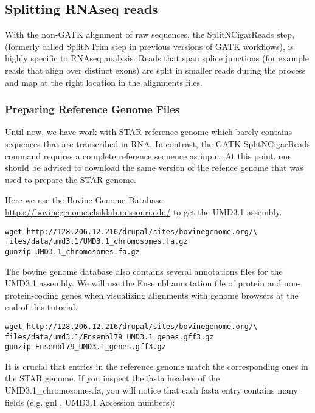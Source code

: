 \subsection{Splitting RNAseq reads}

With the non-GATK alignment of raw sequences, the SplitNCigarReads step, (formerly called SplitNTrim step in previous versions of GATK workflows), is highly specific to RNAseq analysis. Reads that span splice junctions (for example reads that align over distinct exons) are split in smaller reads during the process and map at the right location in the alignments files.

\subsubsection{Preparing Reference Genome Files}

Until now, we have work with STAR reference genome which barely contains sequences that are transcribed in RNA. In contrast, the GATK SplitNCigarReads command requires a complete reference sequence as input. At this point, one should be advised to download the same version of the refence genome that was used to prepare the STAR genome.

Here we use the Bovine Genome Database \href{https://bovinegenome.elsiklab.missouri.edu/}{https://bovinegenome.elsiklab.missouri.edu/} to get the UMD3.1 assembly.


\begin{verbatim}
wget http://128.206.12.216/drupal/sites/bovinegenome.org/\
files/data/umd3.1/UMD3.1_chromosomes.fa.gz
gunzip UMD3.1_chromosomes.fa.gz
\end{verbatim}


The bovine genome database also contains several annotations files for the UMD3.1 assembly. We will use the Ensembl annotation file of protein and non-protein-coding genes when visualizing alignments with genome browsers at the end of this tutorial.

\begin{verbatim}
wget http://128.206.12.216/drupal/sites/bovinegenome.org/\
files/data/umd3.1/Ensembl79_UMD3.1_genes.gff3.gz
gunzip Ensembl79_UMD3.1_genes.gff3.gz
\end{verbatim}


It is crucial that entries in the reference genome match the corresponding ones in the STAR genome. If you inspect the fasta headers of the UMD3.1\_chromosomes.fa, you will notice that each fasta entry contains many fields (e.g. gnl , UMD3.1 Accession numbers):

